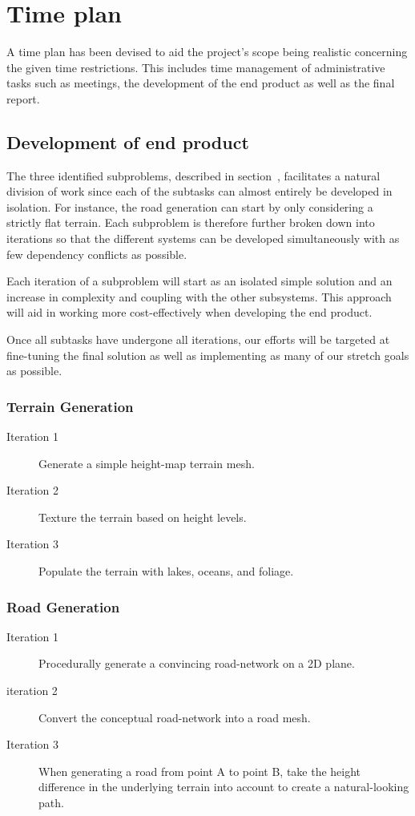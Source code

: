 \section{Time plan}
%

A time plan has been devised to aid the project's scope being realistic concerning the given time restrictions.
This includes time management of administrative tasks such as meetings, the development of the end product as well as the final report.


\subsection{Development of end product}
The three identified subproblems, described in section~, facilitates a natural division of work since each of the subtasks can almost entirely be developed in isolation.
For instance, the road generation can start by only considering a strictly flat terrain.
Each subproblem is therefore further broken down into iterations so that the different systems can be developed simultaneously with as few dependency conflicts as possible.

Each iteration of a subproblem will start as an isolated simple solution and an increase in complexity and coupling with the other subsystems.
This approach will aid in working more cost-effectively when developing the end product.

Once all subtasks have undergone all iterations, our efforts will be targeted at fine-tuning the final solution as well as implementing as many of our stretch goals as possible.

\subsubsection{Terrain Generation}
\begin{description}
  \item[Iteration 1] Generate a simple height-map terrain mesh.
  \item[Iteration 2] Texture the terrain based on height levels.
  \item[Iteration 3] Populate the terrain with lakes, oceans, and foliage.
\end{description}

\subsubsection{Road Generation}
\begin{description}
  \item[Iteration 1] Procedurally generate a convincing road-network on a 2D plane.
  \item[iteration 2] Convert the conceptual road-network into a road mesh.
  \item[Iteration 3] When generating a road from point A to point B, take the height difference in the underlying terrain into account to create a natural-looking path.
\end{description}

